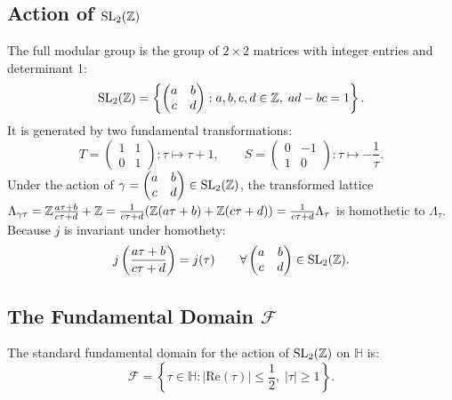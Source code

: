 \documentclass[a4paper]{article}
\begin{document}
\subsection{Action of \texorpdfstring{$\mathrm{SL}_2(\mathbb{Z})$}{SL2(Z)}}
The full modular group is the group of $2 \times 2$ matrices with integer entries and determinant 1:
\begin{equation}
 \mathrm{SL}_2(\mathbb{Z}) = \left\{ \begin{pmatrix} a & b \\ c & d \end{pmatrix} : a, b, c, d \in \mathbb{Z}, \; ad - bc = 1 \right\}.
\end{equation}
It is generated by two fundamental transformations:
\begin{equation}
 T = \begin{pmatrix} 1 & 1 \\ 0 & 1 \end{pmatrix}: \tau \mapsto \tau + 1, \qquad S = \begin{pmatrix} 0 & -1 \\ 1 & 0 \end{pmatrix}: \tau \mapsto -\frac{1}{\tau}.
\end{equation}
Under the action of $\gamma = \begin{pmatrix} a & b \\ c & d \end{pmatrix} \in \mathrm{SL}_2(\mathbb{Z})$, the transformed lattice $\Lambda_{\gamma\tau} = \mathbb{Z} \frac{a\tau+b}{c\tau+d} + \mathbb{Z} = \frac{1}{c\tau+d} (\mathbb{Z}(a\tau+b) + \mathbb{Z}(c\tau+d)) = \frac{1}{c\tau+d} \Lambda_\tau$ is homothetic to $\Lambda_\tau$. Because $j$ is invariant under homothety:
\begin{equation}
 j\left(\frac{a\tau + b}{c\tau + d}\right) = j(\tau) \qquad \forall \begin{pmatrix} a & b \\ c & d \end{pmatrix} \in \mathrm{SL}_2(\mathbb{Z}).
\end{equation}

\subsection{The Fundamental Domain \texorpdfstring{$\mathcal{F}$}{F}}
The standard fundamental domain for the action of $\mathrm{SL}_2(\mathbb{Z})$ on $\mathbb{H}$ is:
\begin{equation}
 \mathcal{F} = \left\{ \tau \in \mathbb{H} : |\mathrm{Re}(\tau)| \le \frac{1}{2}, \; |\tau| \ge 1 \right\}.
\end{equation}
\end{document}
